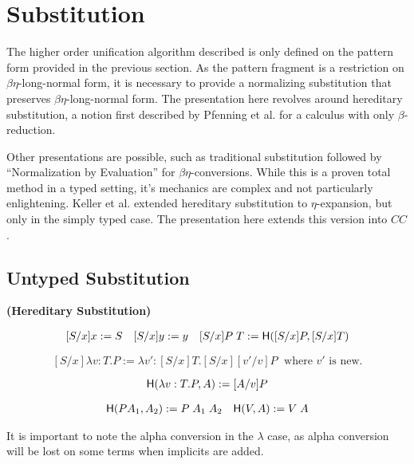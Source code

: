 \section{Substitution}

The higher order unification algorithm described is only defined on the pattern form provided in the previous section.
As the pattern fragment is a restriction on $\beta\eta$-long-normal form, it is necessary to provide a normalizing
substitution that preserves $\beta\eta$-long-normal form.  The presentation here
revolves around hereditary substitution, a notion first described by Pfenning et al. \citep{pfenning1991logic} for
a calculus with only $\beta$-reduction.

Other presentations are possible, such as traditional substitution followed by ``Normalization by Evaluation''
for $\beta\eta$-conversions\citep{abel2010towards}. 
While this is a proven total method in a typed setting, it's mechanics
are complex and not particularly enlightening.  
Keller et al. \citep{keller2010normalization}
extended hereditary substitution to $\eta$-expansion, but only in the simply typed case. 
The presentation here extends this version into $CC$.

\subsection{Untyped Substitution}

\begin{definition}
\textbf{(Hereditary Substitution)} 

\[ \begin{array}[3]{llr}
[ S / x ] x := S
&
[S / x] y := y
&
[S / x] P\;T := \m{H}([S/x] P, [S/x]T)
\end{array} \]

\[
[S / x] \lambda v : T . P := \lambda v' : [S/x]T . [S/x][v'/v]P
\;
\text{  where $v'$ is new.}
\]

\[ 
\mathsf{H}(\lambda v : T . P , A) := [A/v] P
\]

\[ \begin{array}[2]{lr}
\m{H}(P A_1 , A_2) := P\;A_1\;A_2
&
\m{H}(V , A) := V\; A
\end{array} \]

\label{def:shered}
\end{definition}

It is important to note the alpha conversion in the $\lambda$ case, as alpha conversion will be lost on 
some terms when implicits are added.

